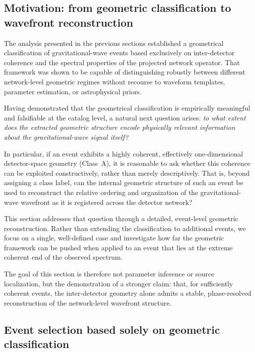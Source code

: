 \documentclass[11pt,a4paper]{article}
\begin{document}
\subsection{Motivation: from geometric classification to wavefront reconstruction}

The analysis presented in the previous sections established a geometrical classification
of gravitational-wave events based exclusively on inter-detector coherence and the
spectral properties of the projected network operator.
That framework was shown to be capable of distinguishing robustly between different
network-level geometric regimes without recourse to waveform templates, parameter
estimation, or astrophysical priors.

Having demonstrated that the geometrical classification is empirically meaningful and
falsifiable at the catalog level, a natural next question arises:
\emph{to what extent does the extracted geometric structure encode physically relevant
information about the gravitational-wave signal itself?}

In particular, if an event exhibits a highly coherent, effectively one-dimensional
detector-space geometry (Class~A), it is reasonable to ask whether this coherence can be
exploited constructively, rather than merely descriptively.
That is, beyond assigning a class label, can the internal geometric structure of such an
event be used to reconstruct the relative ordering and organization of the gravitational-
wave wavefront as it is registered across the detector network?

This section addresses that question through a detailed, event-level geometric
reconstruction.
Rather than extending the classification to additional events, we focus on a single,
well-defined case and investigate how far the geometric framework can be pushed when
applied to an event that lies at the extreme coherent end of the observed spectrum.

The goal of this section is therefore not parameter inference or source localization, but
the demonstration of a stronger claim: that, for sufficiently coherent events, the
inter-detector geometry alone admits a stable, phase-resolved reconstruction of the
network-level wavefront structure.

\subsection{Event selection based solely on geometric classification}
\end{document}
